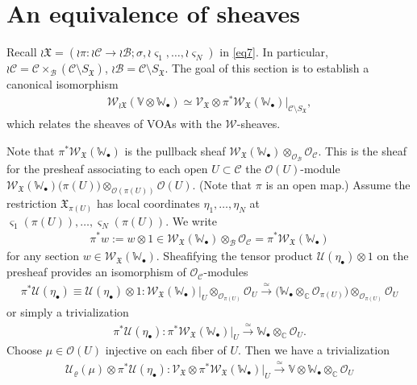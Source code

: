\documentclass[12pt,a4paper,notitlepage]{article}
\theoremstyle{definition}
\theoremstyle{plain}
\newcommand{\fk}{\mathfrak}
\newcommand{\mc}{\mathcal}
\newcommand{\scr}{\mathscr}
\newcommand{\sgm}{\varsigma}
\newcommand{\SX}{{S_{\fk X}}}
\newcommand{\blt}{\bullet}
\newcommand{\Vbb}{\mathbb V}
\newcommand{\Wbb}{\mathbb W}
\newcommand{\Cbb}{\mathbb C}
\numberwithin{equation}{section}
\begin{document}
\section{An equivalence of sheaves}\label{lb15}




Recall $\wr\fk X=(\wr\pi:\wr\mc C\rightarrow\wr\mc B;\sigma,\wr\sgm_1,\dots,\wr\sgm_N)$ in \eqref{eq7}. In particular, $\wr\mc C=\mc C\times_{\mc B}(\mc C\setminus\SX)$, $\wr\mc B=\mc C\setminus\SX$. The goal of this section is to establish a canonical isomorphism
\begin{align*}
\scr W_{\wr\fk X}(\Vbb\otimes\Wbb_\blt)\simeq	\scr V_{\fk X}\otimes\pi^*\scr W_{\fk X}(\Wbb_\blt)|_{\mc C\setminus\SX},
\end{align*}
which relates the sheaves of VOAs with the $\scr W$-sheaves.

Note that $\pi^*\scr W_{\fk X}(\Wbb_\blt)$ is the pullback sheaf $\scr W_{\fk X}(\Wbb_\blt)\otimes_{\scr O_{\mc B}}\scr O_{\mc C}$. This is the sheaf for the presheaf associating to each open $U\subset\mc C$ the $\scr O(U)$-module $\scr W_{\fk X}(\Wbb_\blt)\big(\pi(U)\big)\otimes_{\scr O(\pi(U))}\scr O(U)$. (Note that $\pi$ is an open map.)  Assume the restriction $\fk X_{\pi(U)}$ has local coordinates $\eta_1,\dots,\eta_N$ at $\sgm_1(\pi(U)),\dots,\sgm_N(\pi(U))$. We write
\begin{align*}
\pi^* w:=w\otimes 1\in\scr W_{\fk X}(\Wbb_\blt)\otimes_{\mc B}\scr O_{\mc C}=\pi^*\scr W_{\fk X}(\Wbb_\blt)	
\end{align*}
for any section $w\in\scr W_{\fk X}(\Wbb_\blt)$. Sheafifying the tensor product $\mc U(\eta_\blt)\otimes 1$ on the presheaf provides an isomorphism of $\scr O_{\mc C}$-modules \index{Uzz@$\pi^*\mc U(\eta_\blt)$}
\begin{align}
\pi^*\mc U(\eta_\blt)\equiv \mc U(\eta_\blt)\otimes 1:\scr W_{\fk X}(\Wbb_\blt)\big|_U\otimes_{\scr O_{\pi(U)}}\scr O_U\xrightarrow{\simeq}\Big(\Wbb_\blt\otimes_\Cbb\scr O_{\pi(U)}\Big)\otimes_{\scr O_{\pi(U)}}\scr O_U\label{eq13}
\end{align}
or simply a trivialization
\begin{align}
\pi^*\mc U(\eta_\blt):\pi^*\scr W_{\fk X}(\Wbb_\blt)\big|_U\xrightarrow{\simeq}\Wbb_\blt\otimes_\Cbb\scr O_U.	
\end{align}
Choose $\mu\in\scr O(U)$ injective on each fiber of $U$. Then we have a trivialization
\begin{align}
\boxed{~\mc U_\varrho(\mu)\otimes\pi^*\mc U(\eta_\blt):	\scr V_{\fk X}\otimes\pi^*\scr W_{\fk X}(\Wbb_\blt)\big|_U\xrightarrow{\simeq}\Vbb\otimes\Wbb_\blt\otimes_\Cbb\scr O_U~}\label{eq16}
\end{align}
\end{document}
